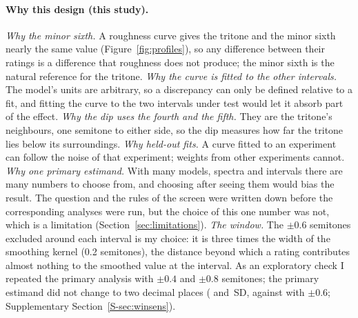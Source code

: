 \documentclass[11pt,a4paper]{article}
\newcommand{\SDu}{\,SD}
\begin{document}
\paragraph{Why this design (this study).}
\emph{Why the minor sixth.} A roughness curve gives the tritone and the minor sixth nearly
the same value (Figure~\ref{fig:profiles}), so any difference between their ratings is a
difference that roughness does not produce; the minor sixth is the natural reference for
the tritone. \emph{Why the curve is fitted to the other intervals.} The model's units are arbitrary, so
a discrepancy can only be defined relative to a fit, and fitting the curve to the two
intervals under test would let it absorb part of the effect. \emph{Why the dip uses the
fourth and the fifth.} They are the tritone's neighbours, one semitone to either side, so
the dip measures how far the tritone lies below its surroundings. \emph{Why held-out fits.}
A curve fitted to an experiment can follow the noise of that experiment; weights from other
experiments cannot. \emph{Why one primary estimand.} With many models, spectra and intervals
there are many numbers to choose from, and choosing after seeing them would bias the result.
The question and the rules of the screen were written down before the corresponding
analyses were run, but the choice of this one number was not, which is a limitation (Section~\ref{sec:limitations}).
\emph{The window.} The $\pm0.6$ semitones excluded around each interval is my choice: it is
three times the width of the smoothing kernel (0.2 semitones), the distance beyond which a rating contributes almost
nothing to the smoothed value at the interval. As an exploratory check I repeated the
primary analysis with $\pm0.4$ and $\pm0.8$ semitones; the primary estimand did not
change to two decimal places (\winGapFour{} and \winGapEight\SDu, against \primGap{} with
$\pm0.6$; Supplementary Section~\ref{S-sec:winsens}).
\end{document}
